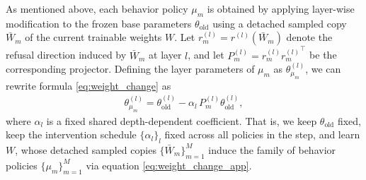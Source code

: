 \documentclass{article}
\theoremstyle{plain}
\theoremstyle{definition}
\theoremstyle{remark}
\begin{document}
As mentioned above, each behavior policy $\mu_m$ is obtained by applying layer-wise modification to the frozen base parameters $\theta_\text{old}$ using a detached sampled copy $\bar W_m$ of the current trainable weights $W$.
Let $r_m^{(l)} = r^{(l)}(\bar W_m)$ denote the refusal direction induced by $\bar W_m$ at layer $l$, and let $P_m^{(l)} = r_m^{(l)} {r_m^{(l)}}^\top$ be the corresponding projector. Defining the layer parameters of $\mu_m$ as $\theta_{\mu_m}^{(l)}$, we can rewrite formula \eqref{eq:weight_change} as
\begin{align}
\label{eq:weight_change_app}
\theta_{\mu_m}^{(l)} = \theta_\text{old}^{(l)} - \alpha_l\, P_m^{(l)} \theta_\text{old}^{(l)}, 
\end{align}
where $\alpha_l$ is a fixed shared depth-dependent coefficient. That is, we keep $\theta_\text{old}$ fixed, keep the intervention schedule $\{\alpha_l\}_l$ fixed across all policies in the step, and learn $W$, whose detached sampled copies $\{\bar W_m\}_{m=1}^M$ induce the family of behavior policies $\{\mu_m\}_{m=1}^M$ via equation \eqref{eq:weight_change_app}.



\end{document}

